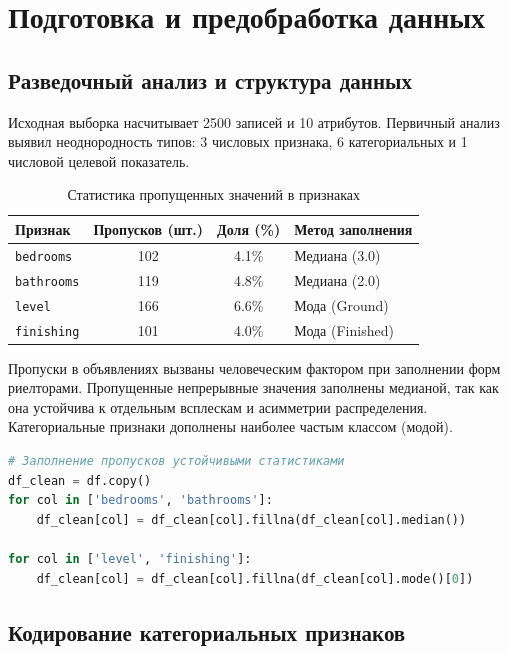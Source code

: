 \chapter{Подготовка и предобработка данных}

\section{Разведочный анализ и структура данных}

Исходная выборка насчитывает 2500 записей и 10 атрибутов. Первичный анализ выявил неоднородность типов: 3 числовых признака, 6 категориальных и 1 числовой целевой показатель.

\begin{table}[H]
\centering
\small
\caption{Статистика пропущенных значений в признаках}
\begin{tabular}{|l|c|c|l|}
\hline
\textbf{Признак} & \textbf{Пропусков (шт.)} & \textbf{Доля (\%)} & \textbf{Метод заполнения} \\
\hline
\texttt{bedrooms} & 102 & 4.1\% & Медиана (3.0) \\
\texttt{bathrooms} & 119 & 4.8\% & Медиана (2.0) \\
\texttt{level} & 166 & 6.6\% & Мода (Ground) \\
\texttt{finishing} & 101 & 4.0\% & Мода (Finished) \\
\hline
\end{tabular}
\end{table}

Пропуски в объявлениях вызваны человеческим фактором при заполнении форм риелторами. Пропущенные непрерывные значения заполнены медианой, так как она устойчива к отдельным всплескам и асимметрии распределения. Категориальные признаки дополнены наиболее частым классом (модой).

\begin{lstlisting}[language=Python]
# Заполнение пропусков устойчивыми статистиками
df_clean = df.copy()
for col in ['bedrooms', 'bathrooms']:
    df_clean[col] = df_clean[col].fillna(df_clean[col].median())

for col in ['level', 'finishing']:
    df_clean[col] = df_clean[col].fillna(df_clean[col].mode()[0])
\end{lstlisting}

\section{Кодирование категориальных признаков}

